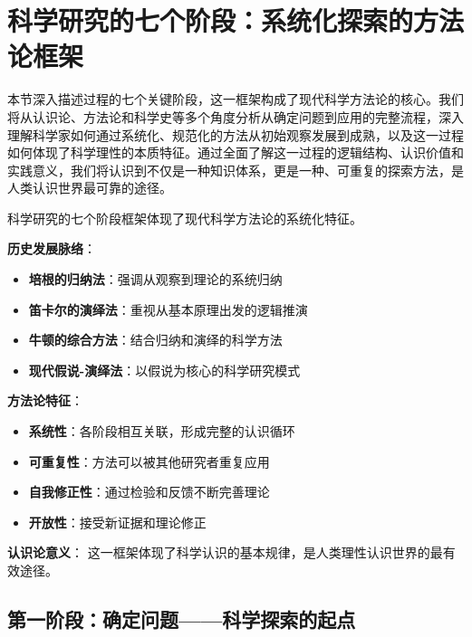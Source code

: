\section{科学研究的七个阶段：系统化探索的方法论框架}

\begin{logicbox}[title=引言]
本节深入描述过程的七个关键阶段，这一框架构成了现代科学方法论的核心。我们将从认识论、方法论和科学史等多个角度分析从确定问题到应用的完整流程，深入理解科学家如何通过系统化、规范化的方法从初始观察发展到成熟，以及这一过程如何体现了科学理性的本质特征。通过全面了解这一过程的逻辑结构、认识价值和实践意义，我们将认识到不仅是一种知识体系，更是一种、可重复的探索方法，是人类认识世界最可靠的途径。
\end{logicbox}

\begin{theorembox}[title=科学研究方法论的理论基础]
科学研究的七个阶段框架体现了现代科学方法论的系统化特征。

\textbf{历史发展脉络}：
\begin{itemize}
\item \textbf{培根的归纳法}：强调从观察到理论的系统归纳
\item \textbf{笛卡尔的演绎法}：重视从基本原理出发的逻辑推演
\item \textbf{牛顿的综合方法}：结合归纳和演绎的科学方法
\item \textbf{现代假说-演绎法}：以假说为核心的科学研究模式
\end{itemize}

\textbf{方法论特征}：
\begin{itemize}
\item \textbf{系统性}：各阶段相互关联，形成完整的认识循环
\item \textbf{可重复性}：方法可以被其他研究者重复应用
\item \textbf{自我修正性}：通过检验和反馈不断完善理论
\item \textbf{开放性}：接受新证据和理论修正
\end{itemize}

\textbf{认识论意义}：
这一框架体现了科学认识的基本规律，是人类理性认识世界的最有效途径。
\end{theorembox}

\subsection{第一阶段：确定问题——科学探索的起点}

